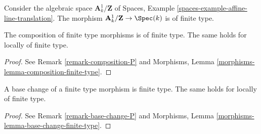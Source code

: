 \noindent
Consider the algebraic space $\mathbf{A}^1_k/\mathbf{Z}$ of
Spaces, Example \ref{spaces-example-affine-line-translation}.
The morphism $\mathbf{A}^1_k/\mathbf{Z} \to \Spec(k)$
is of finite type.

\begin{lemma}
\label{lemma-composition-finite-type}
The composition of finite type morphisms is of finite type.
The same holds for locally of finite type.
\end{lemma}

\begin{proof}
See Remark \ref{remark-composition-P} and
Morphisms, Lemma \ref{morphisms-lemma-composition-finite-type}.
\end{proof}

\begin{lemma}
\label{lemma-base-change-finite-type}
A base change of a finite type morphism is finite type.
The same holds for locally of finite type.
\end{lemma}

\begin{proof}
See Remark \ref{remark-base-change-P} and
Morphisms, Lemma \ref{morphisms-lemma-base-change-finite-type}.
\end{proof}

